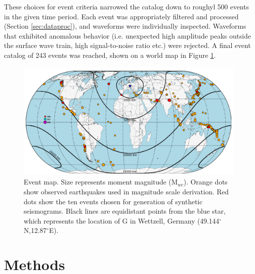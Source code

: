 \documentclass{gji}
\begin{document}
These choices for event criteria narrowed the catalog down to roughyl 500 events in the given time period. Each event was appropriately filtered and processed (Section \ref{sec:dataproc}), and waveforms were individually inspected. Waveforms that exhibited anomalous behavior (i.e. unexpected high amplitude peaks outside the surface wave train, high signal-to-noise ratio etc.) were rejected. A final event catalog of 243 events was reached, shown on a world map in Figure \ref{fig:event_map}.

\begin{figure}
\centerline{\includegraphics[width=.8\textwidth]{event_map}}
\caption{Event map. Size represents moment magnitude (M$_{wc}$). Orange dots show observed earthquakes used in magnitude scale derivation. Red dots show the ten events chosen for generation of synthetic seismograms. Black lines are equidistant points from the blue star, which represents the location of G in Wettzell, Germany (49.144$^\circ$N,12.87$^\circ$E).}
\label{fig:event_map}
\end{figure}

\section{Methods}
\end{document}
